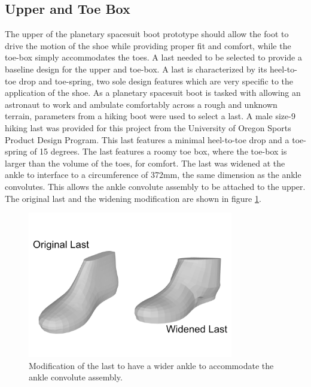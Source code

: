 \documentclass[defaultstyle,11pt]{thesis}
\begin{document}
\hypertarget{upper-and-toe-box}{%
\subsection{Upper and Toe Box}\label{upper-and-toe-box}}

The upper of the planetary spacesuit boot prototype should allow the foot to drive the motion of the shoe while providing proper fit and comfort, while the toe-box simply accommodates the toes.
A last needed to be selected to provide a baseline design for the upper and toe-box.
A last is characterized by its heel-to-toe drop and toe-spring, two sole design features which are very specific to the application of the shoe.
As a planetary spacesuit boot is tasked with allowing an astronaut to work and ambulate comfortably across a rough and unknown terrain, parameters from a hiking boot were used to select a last.
A male size-9 hiking last was provided for this project from the University of Oregon Sports Product Design Program.
This last features a minimal heel-to-toe drop and a toe-spring of 15 degrees.
The last features a roomy toe box, where the toe-box is larger than the volume of the toes, for comfort.
The last was widened at the ankle to interface to a circumference of 372mm, the same dimension as the ankle convolutes.
This allows the ankle convolute assembly to be attached to the upper.
The original last and the widening modification are shown in figure \ref{fig:SA3-lastmod}.

\begin{figure}
\hypertarget{fig:SA3-lastmod}{%
\centering
\includegraphics[width=0.8\textwidth,height=\textheight]{../fig/SA3/LastModification.png}
\caption{Modification of the last to have a wider ankle to accommodate the ankle convolute assembly.}\label{fig:SA3-lastmod}
}
\end{figure}
\end{document}
